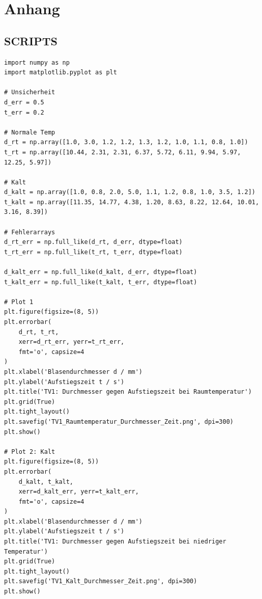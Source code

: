 \documentclass{report}
\begin{document}
\newpage
\chapter{Anhang}
\section{SCRIPTS}

\begin{lstlisting}[caption={Python-Skript zur Darstellung von TV1 mit Fehlerbalken}]
import numpy as np
import matplotlib.pyplot as plt

# Unsicherheit
d_err = 0.5
t_err = 0.2

# Normale Temp
d_rt = np.array([1.0, 3.0, 1.2, 1.2, 1.3, 1.2, 1.0, 1.1, 0.8, 1.0])
t_rt = np.array([10.44, 2.31, 2.31, 6.37, 5.72, 6.11, 9.94, 5.97, 12.25, 5.97])

# Kalt
d_kalt = np.array([1.0, 0.8, 2.0, 5.0, 1.1, 1.2, 0.8, 1.0, 3.5, 1.2])
t_kalt = np.array([11.35, 14.77, 4.38, 1.20, 8.63, 8.22, 12.64, 10.01, 3.16, 8.39])

# Fehlerarrays
d_rt_err = np.full_like(d_rt, d_err, dtype=float)
t_rt_err = np.full_like(t_rt, t_err, dtype=float)

d_kalt_err = np.full_like(d_kalt, d_err, dtype=float)
t_kalt_err = np.full_like(t_kalt, t_err, dtype=float)

# Plot 1
plt.figure(figsize=(8, 5))
plt.errorbar(
    d_rt, t_rt,
    xerr=d_rt_err, yerr=t_rt_err,
    fmt='o', capsize=4
)
plt.xlabel('Blasendurchmesser d / mm')
plt.ylabel('Aufstiegszeit t / s')
plt.title('TV1: Durchmesser gegen Aufstiegszeit bei Raumtemperatur')
plt.grid(True)
plt.tight_layout()
plt.savefig('TV1_Raumtemperatur_Durchmesser_Zeit.png', dpi=300)
plt.show()

# Plot 2: Kalt
plt.figure(figsize=(8, 5))
plt.errorbar(
    d_kalt, t_kalt,
    xerr=d_kalt_err, yerr=t_kalt_err,
    fmt='o', capsize=4
)
plt.xlabel('Blasendurchmesser d / mm')
plt.ylabel('Aufstiegszeit t / s')
plt.title('TV1: Durchmesser gegen Aufstiegszeit bei niedriger Temperatur')
plt.grid(True)
plt.tight_layout()
plt.savefig('TV1_Kalt_Durchmesser_Zeit.png', dpi=300)
plt.show()
\end{lstlisting}
\end{document}
